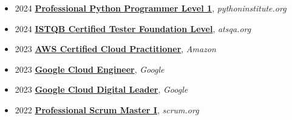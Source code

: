 \documentclass[10pt, a4paper]{article}
\newcommand{\cert}[4]{
\hypersetup{urlcolor=black}
  #1 \textbf{\href{#4}{#2}}, \textit{#3}%
}
\begin{document}
\begin{minipage}[t]{0.56\textwidth}
\begin{itemize}
\item \cert{2024}{Professional Python Programmer Level 1}{pythoninstitute.org}{https://verify.openedg.org/?id=gqtL.HUbN.Eshb}
\item \cert{2024}{ISTQB Certified Tester Foundation Level}{atsqa.org}{https://www.istqb.org/certifications/certified-tester-foundation-level-ctfl-v4-0/}
\item \cert{2023}{AWS Certified Cloud Practitioner}{Amazon}{https://www.credly.com/badges/d7c6436d-91aa-4124-a530-67f185f6f372/public_url}
\item \cert{2023}{Google Cloud Engineer}{Google}{https://google.accredible.com/d46ea4b1-ef6d-4510-a2ed-23ae1cf0a7e6}
\item \cert{2023}{Google Cloud Digital Leader}{Google}{https://www.credential.net/b68d248c-d7ac-4b19-9ee7-7bfecfccc8b2}
\item \cert{2022}{Professional Scrum Master I}{scrum.org}{https://www.scrum.org/user/1062623}
\end{itemize}



\end{minipage}
\end{document}
